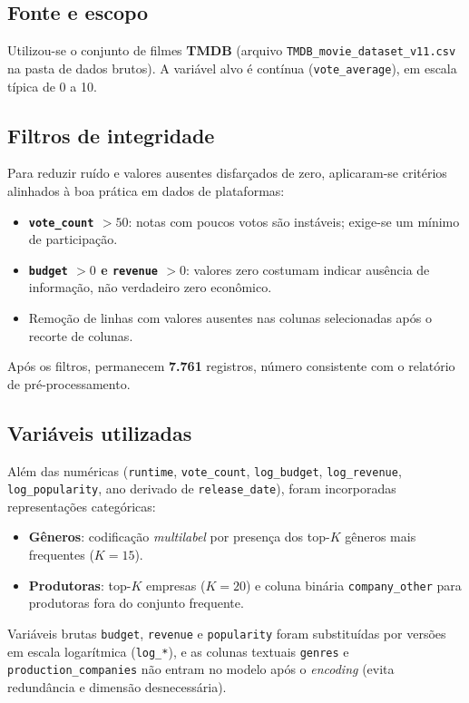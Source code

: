 \documentclass[11pt,a4paper]{article}
\begin{document}
\subsection{Fonte e escopo}
Utilizou-se o conjunto de filmes \textbf{TMDB} (arquivo \texttt{TMDB\_movie\_dataset\_v11.csv} na pasta de dados brutos). A variável alvo é contínua (\texttt{vote\_average}), em escala típica de 0 a 10.

\subsection{Filtros de integridade}
Para reduzir ruído e valores ausentes disfarçados de zero, aplicaram-se critérios alinhados à boa prática em dados de plataformas:
\begin{itemize}
  \item \textbf{\texttt{vote\_count} $> 50$}: notas com poucos votos são instáveis; exige-se um mínimo de participação.
  \item \textbf{\texttt{budget} $> 0$ e \texttt{revenue} $> 0$}: valores zero costumam indicar ausência de informação, não verdadeiro zero econômico.
  \item Remoção de linhas com valores ausentes nas colunas selecionadas após o recorte de colunas.
\end{itemize}

Após os filtros, permanecem \textbf{7.761} registros, número consistente com o relatório de pré-processamento.

\subsection{Variáveis utilizadas}
Além das numéricas (\texttt{runtime}, \texttt{vote\_count}, \texttt{log\_budget}, \texttt{log\_revenue}, \texttt{log\_popularity}, ano derivado de \texttt{release\_date}), foram incorporadas representações categóricas:
\begin{itemize}
  \item \textbf{Gêneros}: codificação \emph{multilabel} por presença dos top-$K$ gêneros mais frequentes ($K=15$).
  \item \textbf{Produtoras}: top-$K$ empresas ($K=20$) e coluna binária \texttt{company\_other} para produtoras fora do conjunto frequente.
\end{itemize}

Variáveis brutas \texttt{budget}, \texttt{revenue} e \texttt{popularity} foram substituídas por versões em escala logarítmica (\texttt{log\_*}), e as colunas textuais \texttt{genres} e \texttt{production\_companies} não entram no modelo após o \emph{encoding} (evita redundância e dimensão desnecessária).
\end{document}
